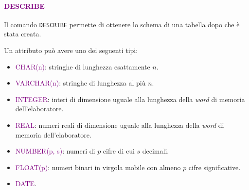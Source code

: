 \paragraph{\textcolor{purple}{DESCRIBE}} Il comando \verb|DESCRIBE| permette di ottenere
lo schema di una tabella dopo che è stata creata.

Un attributo può avere uno dei seguenti tipi:
\begin{itemize}
    \item \textcolor{purple}{CHAR(n)}: stringhe di lunghezza esattamente $n$.
    \item \textcolor{purple}{VARCHAR(n)}: stringhe di lunghezza al più $n$.
    \item \textcolor{purple}{INTEGER}: interi di dimensione uguale alla lunghezza della \emph{word}
        di memoria dell'elaboratore.
    \item \textcolor{purple}{REAL}: numeri reali di dimensione uguale alla lunghezza della \emph{word}
    di memoria dell'elaboratore.
    \item \textcolor{purple}{NUMBER(p, s)}: numeri di $p$ cifre di cui $s$ decimali.
    \item \textcolor{purple}{FLOAT(p)}: numeri binari in virgola mobile con almeno $p$ cifre significative.
    \item \textcolor{purple}{DATE}.
\end{itemize}

